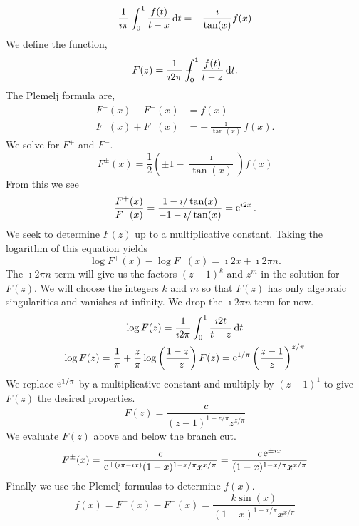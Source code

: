 \begin{Solution}
  \[
  \frac{1}{\imath \pi} - \negthickspace \negthickspace \negthickspace \negmedspace\int_0^1 \frac{ f(t) }{ t-x } \,\mathrm{d} t
  = - \frac{ \imath }{ \tan(x) } f(x)
  \]
  We define the function,
  \[
  F(z) = \frac{1}{\imath 2 \pi} - \negthickspace \negthickspace \negthickspace \negmedspace\int_0^1 \frac{ f(t) }{ t-z } \,\mathrm{d} t.
  \]
  The Plemelj formula are,
  \begin{align*}
    F^+(x) - F^-(x) &= f(x) \\
    F^+(x) + F^-(x) &= - \frac{\imath}{\tan(x)} f(x).
  \end{align*}
  We solve for $F^+$ and $F^-$.
  \[
  F^\pm(x) = \frac{1}{2} \left( \pm 1 - \frac{\imath}{\tan(x)} \right) f(x)
  \]
  From this we see
  \[
  \frac{F^+(x)}{F^-(x)} = \frac{ 1 - \imath / \tan(x) }{ -1 - \imath / \tan(x) }
  = \mathop{\mathrm{e}}\nolimits^{\imath 2 x}.
  \]
  We seek to determine $F(z)$ up to a multiplicative constant.
  Taking the logarithm of this equation yields
  \[
  \log F^+(x) - \log F^-(x) = \imath 2 x + \imath 2 \pi n.
  \]
  The $\imath 2 \pi n$ term will give us the factors $(z-1)^k$ and $z^m$ in the 
  solution for $F(z)$.  We will choose the integers $k$ and $m$ so that 
  $F(z)$ has only algebraic singularities and vanishes at infinity.  We drop
  the $\imath 2 \pi n$ term for now. 
  \begin{gather*}
    \log F(z) = \frac{1}{\imath 2 \pi} \int_0^1 \frac{\imath 2 t}{t-z} \,\mathrm{d} t \\
    \log F(z) = \frac{1}{\pi} + \frac{z}{\pi} \log \left( \frac{1-z}{-z} \right) 
    F(z) = \mathop{\mathrm{e}}\nolimits^{1/\pi} \left( \frac{z-1}{z} \right)^{z/\pi}
  \end{gather*}
  We replace $\mathop{\mathrm{e}}\nolimits^{1/\pi}$ by a multiplicative constant and multiply by 
  $(z-1)^1$ to give $F(z)$ the desired properties.
  \[
  F(z) = \frac{ c }{ (z-1)^{1-z/\pi} z^{z/\pi} }
  \]
  We evaluate $F(z)$ above and below the branch cut.
  \[
  F^\pm(x) = \frac{ c }{ \mathop{\mathrm{e}}\nolimits^{\pm(\imath \pi - \imath x)} (1-x)^{1-x/\pi} x^{x/\pi} }
  = \frac{ c \mathop{\mathrm{e}}\nolimits^{\pm \imath x} }{ (1-x)^{1-x/\pi} x^{x/\pi} }
  \]
  Finally we use the Plemelj formulas to determine $f(x)$.
  \[
  \boxed{
    f(x) = F^+(x) - F^-(x) = \frac{ k \sin(x) }{ (1-x)^{1-x/\pi} x^{x/\pi} }
    }
  \]
\end{Solution}



